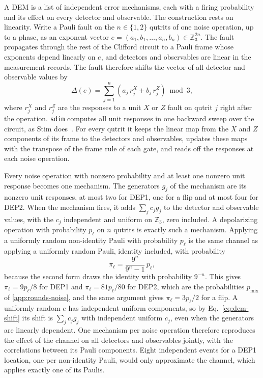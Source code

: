A DEM is a list of independent error mechanisms, each with a firing probability and its effect on every detector and observable. The construction rests on linearity. Write a Pauli fault on the $n \in \{1,2\}$ qutrits of one noise operation, up to a phase, as an exponent vector $e = (a_1, b_1, \dots, a_n, b_n) \in \mathbb{Z}_3^{2n}$. The fault propagates through the rest of the Clifford circuit to a Pauli frame whose exponents depend linearly on $e$, and detectors and observables are linear in the measurement records. The fault therefore shifts the vector of all detector and observable values by
\begin{equation}
    \Delta(e) = \sum_{j=1}^{n} \left( a_j\, r^X_j + b_j\, r^Z_j \right) \bmod 3,
    \label{eq:dem-shift}
\end{equation}
where $r^X_j$ and $r^Z_j$ are the responses to a unit $X$ or $Z$ fault on qutrit $j$ right after the operation. \texttt{sdim} computes all unit responses in one backward sweep over the circuit, as Stim does~\cite{Gidney2021Stim}. For every qutrit it keeps the linear map from the $X$ and $Z$ components of its frame to the detectors and observables, updates these maps with the transpose of the frame rule of each gate, and reads off the responses at each noise operation.

Every noise operation with nonzero probability and at least one nonzero unit response becomes one mechanism. The generators $g_j$ of the mechanism are its nonzero unit responses, at most two for DEP1, one for a flip and at most four for DEP2. When the mechanism fires, it adds $\sum_j c_j g_j$ to the detector and observable values, with the $c_j$ independent and uniform on $\mathbb{Z}_3$, zero included. A depolarizing operation with probability $p_\ell$ on $n$ qutrits is exactly such a mechanism. Applying a uniformly random non-identity Pauli with probability $p_\ell$ is the same channel as applying a uniformly random Pauli, identity included, with probability
\begin{equation}
    \pi_\ell = \frac{9^n}{9^n - 1}\, p_\ell ,
    \label{eq:dem-firing}
\end{equation}
because the second form draws the identity with probability $9^{-n}$. This gives $\pi_\ell = 9p_\ell/8$ for DEP1 and $\pi_\ell = 81p_\ell/80$ for DEP2, which are the probabilities $p_{\mathrm{mix}}$ of \autoref{app:rounds-noise}, and the same argument gives $\pi_\ell = 3p_\ell/2$ for a flip. A uniformly random $e$ has independent uniform components, so by Eq.~\eqref{eq:dem-shift} its shift is $\sum_j c_j g_j$ with independent uniform $c_j$, even when the generators are linearly dependent. One mechanism per noise operation therefore reproduces the effect of the channel on all detectors and observables jointly, with the correlations between its Pauli components. Eight independent events for a DEP1 location, one per non-identity Pauli, would only approximate the channel, which applies exactly one of its Paulis.


